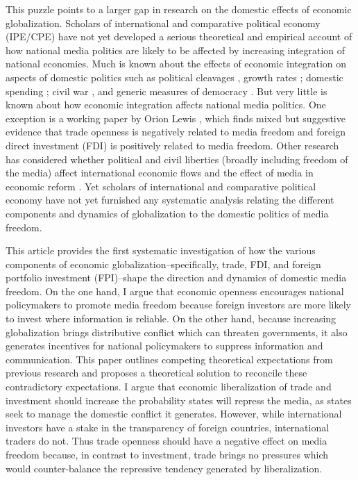 \documentclass[12pt,a4paper]{article}\usepackage[]{graphicx}\usepackage[]{color}
\begin{document}
This puzzle points to a larger gap in research on the domestic effects of economic globalization. Scholars of international and comparative political economy (IPE/CPE) have not yet developed a serious theoretical and empirical account of how national media politics are likely to be affected by increasing integration of national economies. Much is known about the effects of economic integration on aspects of domestic politics such as political cleavages \parencites{Rogowski:1987ip}{Rogowski:1989wm}{Hiscox:2002us}{hiscox2002international}, growth rates \parencite{Rodriguez:2001uw}; domestic spending \parencites{Rodrik:1998te}{Burgoon:2001dp}; civil war \parencites{Barbieri:2005uk}{Bussmann:2007vx}, and generic measures of democracy \parencites{EICHENGREEN:2008gg}{Li:2003vj}. But very little is known about how economic integration affects national media politics. One exception is a working paper by Orion Lewis \parencite*{Lewis:qDvYbWlU}, which finds mixed but suggestive evidence that trade openness is negatively related to media freedom and foreign direct investment (FDI) is positively related to media freedom. Other research has considered whether political and civil liberties (broadly including freedom of the media) affect international economic flows \parencite{Adam:2007gn} and the effect of media in economic reform \parencites{Coyne:2004bq}{Islam:2002uc}. Yet scholars of international and comparative political economy have not yet furnished any systematic analysis relating the different components and dynamics of globalization to the domestic politics of media freedom.

This article provides the first systematic investigation of how the various components of economic globalization--specifically, trade, FDI, and foreign portfolio investment (FPI)--shape the direction and dynamics of domestic media freedom. On the one hand, I argue that economic openness encourages national policymakers to promote media freedom because foreign investors are more likely to invest where information is reliable. On the other hand, because increasing globalization brings distributive conflict which can threaten governments, it also generates incentives for national policymakers to suppress information and communication. This paper outlines competing theoretical expectations from previous research and proposes a theoretical solution to reconcile these contradictory expectations. I argue that economic liberalization of trade and investment should increase the probability states will repress the media, as states seek to manage the domestic conflict it generates. However, while international investors have a stake in the transparency of foreign countries, international traders do not. Thus trade openness should have a negative effect on media freedom because, in contrast to investment, trade brings no pressures which would counter-balance the repressive tendency generated by liberalization.
\end{document}
